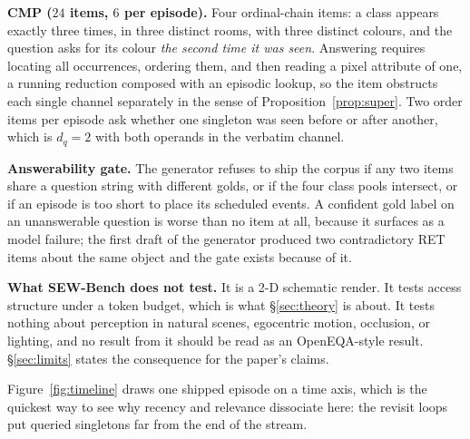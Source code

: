 \documentclass[10pt]{article}
\theoremstyle{definition}
\theoremstyle{plain}
\begin{document}
\textbf{CMP ($24$ items, $6$ per episode).} Four ordinal-chain items: a class appears exactly three times, in three distinct rooms, with three distinct colours, and the question asks for its colour \emph{the second time it was seen}. Answering requires locating all occurrences, ordering them, and then reading a pixel attribute of one, a running reduction composed with an episodic lookup, so the item obstructs each single channel separately in the sense of Proposition~\ref{prop:super}. Two order items per episode ask whether one singleton was seen before or after another, which is $d_q{=}2$ with both operands in the verbatim channel.

\textbf{Answerability gate.} The generator refuses to ship the corpus if any two items share a question string with different golds, or if the four class pools intersect, or if an episode is too short to place its scheduled events. A confident gold label on an unanswerable question is worse than no item at all, because it surfaces as a model failure; the first draft of the generator produced two contradictory RET items about the same object and the gate exists because of it.

\textbf{What SEW-Bench does not test.} It is a 2-D schematic render. It tests access structure under a token budget, which is what \S\ref{sec:theory} is about. It tests nothing about perception in natural scenes, egocentric motion, occlusion, or lighting, and no result from it should be read as an OpenEQA-style result. \S\ref{sec:limits} states the consequence for the paper's claims.

Figure~\ref{fig:timeline} draws one shipped episode on a time axis, which is the quickest way to see why recency and relevance dissociate here: the revisit loops put queried singletons far from the end of the stream.
\end{document}
